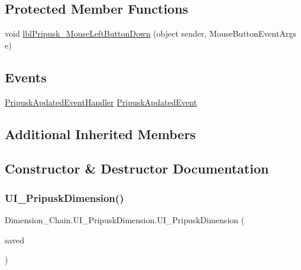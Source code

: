 \subsection*{Protected Member Functions}
\begin{DoxyCompactItemize}
\item 
void \mbox{\hyperlink{class_dimension___chain_1_1_u_i___pripusk_dimension_a38baa1c8258bfa51eed2800eb90be0c7}{lbl\+Pripusk\+\_\+\+Mouse\+Left\+Button\+Down}} (object sender, Mouse\+Button\+Event\+Args e)
\end{DoxyCompactItemize}
\subsection*{Events}
\begin{DoxyCompactItemize}
\item 
\mbox{\hyperlink{class_dimension___chain_1_1_u_i___pripusk_dimension_a94481db964cf4a247a289d740f916590}{Pripusk\+Apdated\+Event\+Handler}} \mbox{\hyperlink{class_dimension___chain_1_1_u_i___pripusk_dimension_aea5b565f3486e8b370b0deb5ce47fdbc}{Pripusk\+Apdated\+Event}}
\end{DoxyCompactItemize}
\subsection*{Additional Inherited Members}


\subsection{Constructor \& Destructor Documentation}
\mbox{\label{class_dimension___chain_1_1_u_i___pripusk_dimension_a1612d83a462124d01e52eb83ca8ca356}} 
\subsubsection{\texorpdfstring{U\+I\+\_\+\+Pripusk\+Dimension()}{UI\_PripuskDimension()}\hspace{0.1cm}{\footnotesize\ttfamily [1/2]}}
{\footnotesize\ttfamily Dimension\+\_\+\+Chain.\+U\+I\+\_\+\+Pripusk\+Dimension.\+U\+I\+\_\+\+Pripusk\+Dimension (\begin{DoxyParamCaption}\item[{\mbox{\hyperlink{class_dimension___chain_1_1_u_i___dimension___save}{U\+I\+\_\+\+Dimension\+\_\+\+Save}}}]{saved }\end{DoxyParamCaption})}

